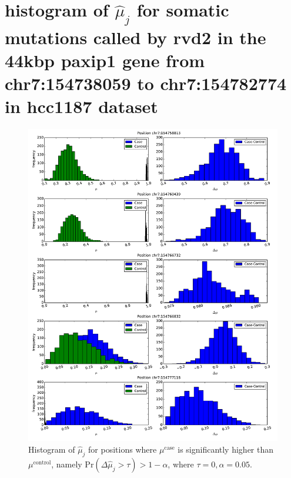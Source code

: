 \documentclass[11pt,reqno]{amsart}
\begin{document}
\section{histogram of $ \hat{\mu}_j $ for somatic mutations called by rvd2 in the 44kbp paxip1 gene from chr7:154738059 to chr7:154782774 in hcc1187 dataset}
\begin{figure}[H]
\begin{center}
\includegraphics[width=1\textwidth]{pdf_figs/HCC1187_histogram_pos.pdf}
\caption{Histogram of $ \hat{\mu}_j $ for positions where $\mu^{\text{case}}$ is significantly higher than $ \mu^{\text{control}}$, namely Pr$ (\Delta \hat{\mu}_j> \tau) > 1- \alpha $, where $ \tau=0, \alpha=0.05 $.} 
\label{fig:hist_pos}
\end{center}
\end{figure}
\end{document}
